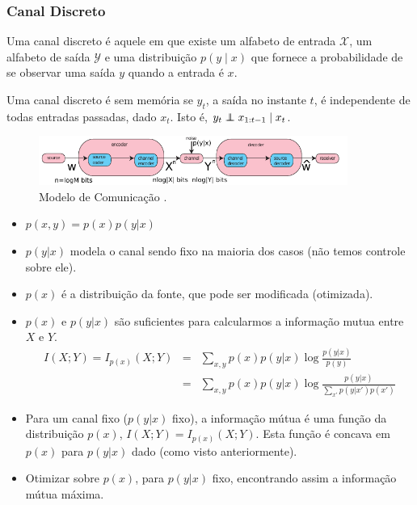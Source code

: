 \begin{frame}[allowframebreaks]
  \frametitle{Canal Discreto}

  \begin{definition}
  Uma canal discreto é aquele em que existe um alfabeto de entrada $\mathcal{X}$, um
  alfabeto de saída $\mathcal{Y}$ e uma distribuição $p(y \mid x)$  que fornece a probabilidade
  de se observar uma saída $y$ quando a entrada é $x$.
  \end{definition}

  \begin{definition}
  Uma canal discreto é sem memória se $y_t$, a saída no instante $t$, é independente 
  de todas entradas passadas, dado $x_t$. Isto é, $y_t \independent x_{1:t-1} \mid x_t$.
  \end{definition}

                \begin{figure}[h!]
                \centering
                \includegraphics[width=0.9\textwidth]{images/modcom.pdf}
		\caption{Modelo de Comunicação \citep{bilmes2013}.}
                \label{fig:modcom}
                \end{figure}
  \begin{itemize}
  \item $p(x,y) = p(x)p(y|x)$ 
  \item $p(y|x)$ modela o canal sendo fixo na maioria dos casos (não temos controle sobre ele).
  \item $p(x)$ é a distribuição da fonte, que pode ser modificada (otimizada). 
  \item $p(x)$ e $p(y|x)$ são suficientes para calcularmos a informação mutua entre $X$ e $Y$.
	\begin{eqnarray}
	I(X;Y) = I_{p(x)} (X;Y) &=& \sum_{x,y} p(x) p(y|x) \log \frac{p(y|x)}{p(y)} \nonumber \\
			&=& \sum_{x,y} p(x) p(y|x) \log \frac{ p(y|x) }{ \sum_{x'} p(y|x') p(x') }
	\end{eqnarray}
  \item Para um canal fixo ($p(y|x)$ fixo), a informação mútua é uma função da distribuição $p(x)$, 
	$I(X;Y) = I_{p(x)} (X;Y)$. Esta função é concava em $p(x)$ para $p(y|x)$ dado (como visto anteriormente). 
  \item Otimizar sobre $p(x)$, para $p(y|x)$ fixo, encontrando assim a informação mútua máxima.
  \end{itemize}


\end{frame}
